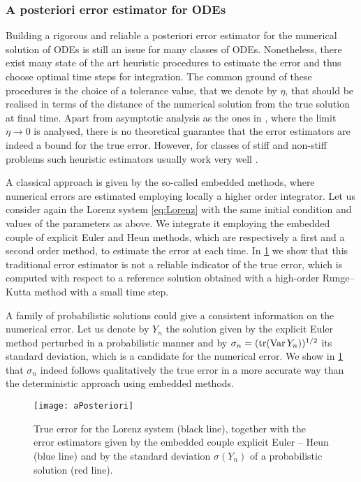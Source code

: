 \documentclass[10pt]{article}
\begin{document}
\subsubsection*{{A posteriori error estimator for ODEs}} Building a rigorous and reliable a posteriori error estimator for the numerical solution of ODEs is still an issue for many classes of ODEs. Nonetheless, there exist many state of the art heuristic procedures to estimate the error and thus choose optimal time steps for integration. The common ground of these procedures is the choice of a tolerance value, that we denote by $\eta$, that should be realised in terms of the distance of the numerical solution from the true solution at final time. Apart from asymptotic analysis as the ones in \cite{HiS98, LaS98}, where the limit $\eta \to 0$ is analysed, there is no theoretical guarantee that the error estimators are indeed a bound for the true error. However, for classes of stiff and non-stiff problems such heuristic estimators usually work very well \cite{HNW93, HaW96}.

A classical approach is given by the so-called embedded methods, where numerical errors are estimated employing locally a higher order integrator. Let us consider again the Lorenz system \eqref{eq:Lorenz} with the same initial condition and values of the parameters as above. We integrate it employing the embedded couple of explicit Euler and Heun methods, which are respectively a first and a second order method, to estimate the error at each time. In \cref{fig:aPosteriori} we show that this traditional error estimator is not a reliable indicator of the true error, which is computed with respect to a reference solution obtained with a high-order Runge--Kutta method with a small time step.

A family of probabilistic solutions could give a consistent information on the numerical error. Let us denote by $Y_n$ the solution given by the explicit Euler method perturbed in a probabilistic manner and by $\sigma_n = (\operatorname{tr}(\operatorname{Var} Y_n))^{1/2}$ its standard deviation, which is a candidate for the numerical error. We show in \cref{fig:aPosteriori} that $\sigma_n$ indeed follows qualitatively the true error in a more accurate way than the deterministic approach using embedded methods.

\begin{figure}
	\centering
	\texttt{[image: aPosteriori]}
	\caption{True error for the Lorenz system (black line), together with the error estimators given by the embedded couple explicit Euler -- Heun (blue line) and by the standard deviation $\sigma(Y_n)$ of a probabilistic solution (red line).}
	\label{fig:aPosteriori}
\end{figure}
\end{document}
